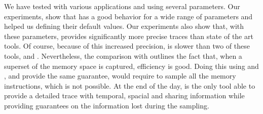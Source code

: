 We have tested \Moca with various applications and using several parameters.
Our experiments, show that \Moca has a good behavior for a wide range of
parameters and helped us defining their default values. Our experiments also
show that, with these parameters, \Moca provides significantly more precise traces
than state of the art tools.
Of course, because of this increased precision, \Moca is slower than two of these tools,
\Memprof and \Mitos.
Nevertheless, the comparison with \TABARNAC outlines the fact that, when a superset of the memory
space is captured, \Moca efficiency is good.
Doing this using \Memprof and \Mitos, and provide the same guarantee, would require to sample all the memory instructions, which is not possible.
At the end of the day, \Moca is the only tool able to provide a
detailed trace with temporal, spacial and sharing information while providing
guarantees on the information lost during the sampling.
